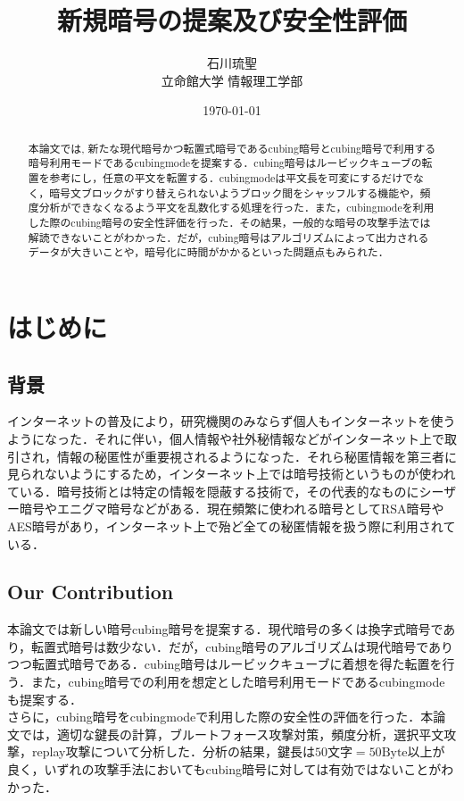 \documentclass[titlepage]{jarticle}
\title{新規暗号の提案及び安全性評価}
\author{石川琉聖\\立命館大学 情報理工学部}
\date{\today}
\begin{document}
\maketitle

\begin{abstract}
本論文では, 新たな現代暗号かつ転置式暗号であるcubing暗号とcubing暗号で利用する暗号利用モードであるcubingmodeを提案する．cubing暗号はルービックキューブの転置を参考にし，任意の平文を転置する．cubingmodeは平文長を可変にするだけでなく，暗号文ブロックがすり替えられないようブロック間をシャッフルする機能や，頻度分析ができなくなるよう平文を乱数化する処理を行った．また，cubingmodeを利用した際のcubing暗号の安全性評価を行った．その結果，一般的な暗号の攻撃手法では解読できないことがわかった．だが，cubing暗号はアルゴリズムによって出力されるデータが大きいことや，暗号化に時間がかかるといった問題点もみられた．
\end{abstract}

\tableofcontents
\newpage

\section{はじめに}
\subsection{背景}
インターネットの普及により，研究機関のみならず個人もインターネットを使うようになった．それに伴い，個人情報や社外秘情報などがインターネット上で取引され，情報の秘匿性が重要視されるようになった．それら秘匿情報を第三者に見られないようにするため，インターネット上では暗号技術というものが使われている．暗号技術とは特定の情報を隠蔽する技術で，その代表的なものにシーザー暗号やエニグマ暗号などがある．現在頻繁に使われる暗号としてRSA暗号やAES暗号があり，インターネット上で殆ど全ての秘匿情報を扱う際に利用されている．\\

\subsection{Our Contribution}
本論文では新しい暗号cubing暗号を提案する．現代暗号の多くは換字式暗号であり，転置式暗号は数少ない．だが，cubing暗号のアルゴリズムは現代暗号でありつつ転置式暗号である．cubing暗号はルービックキューブに着想を得た転置を行う．また，cubing暗号での利用を想定とした暗号利用モードであるcubingmodeも提案する．\\
さらに，cubing暗号をcubingmodeで利用した際の安全性の評価を行った．本論文では，適切な鍵長の計算，ブルートフォース攻撃対策，頻度分析，選択平文攻撃，replay攻撃について分析した．分析の結果，鍵長は\(50\)文字\(=50\text{Byte}\)以上が良く，いずれの攻撃手法においてもcubing暗号に対しては有効ではないことがわかった．
\end{document}
